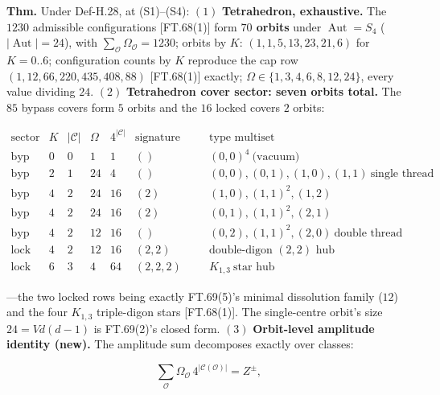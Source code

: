 \begin{theorem}\label{tag:FT-78}
\textbf{Thm.} Under Def-H.28, at (S1)–(S4): $(1)$ \textbf{Tetrahedron, exhaustive.} The $1230$ admissible configurations [FT.68(1)] form \textbf{$70$ orbits} under $\operatorname{Aut}=S_4$ ($|\operatorname{Aut}|=24$), with $\sum_{\mathcal O}\Omega_{\mathcal O}=1230$; orbits by $K$: $(1,1,5,13,23,21,6)$ for $K=0..6$; configuration counts by $K$ reproduce the cap row $(1,12,66,220,435,408,88)$ [FT.68(1)] exactly; $\Omega\in\{1,3,4,6,8,12,24\}$, every value dividing $24$. $(2)$ \textbf{Tetrahedron cover sector: seven orbits total.} The $85$ bypass covers form $5$ orbits and the $16$ locked covers $2$ orbits:

\[
\begin{array}{c|cccccc}
\text{sector} & K & |\mathcal C| & \Omega & 4^{|\mathcal C|} & \text{signature (cycles shadowed)} & \text{type multiset}\\
\hline
\text{byp} & 0 & 0 & 1 & 1 & () & (0,0)^4\ \text{(vacuum)}\\
\text{byp} & 2 & 1 & 24 & 4 & () & (0,0),(0,1),(1,0),(1,1)\ \text{single thread}\\
\text{byp} & 4 & 2 & 24 & 16 & (2) & (1,0),(1,1)^2,(1,2)\\
\text{byp} & 4 & 2 & 24 & 16 & (2) & (0,1),(1,1)^2,(2,1)\\
\text{byp} & 4 & 2 & 12 & 16 & () & (0,2),(1,1)^2,(2,0)\ \text{double thread}\\
\hline
\text{lock} & 4 & 2 & 12 & 16 & (2,2) & \text{double-digon }(2,2)\text{ hub}\\
\text{lock} & 6 & 3 & 4 & 64 & (2,2,2) & K_{1,3}\ \text{star hub}
\end{array}
\]

—the two locked rows being exactly FT.69(5)'s minimal dissolution family ($12$) and the four $K_{1,3}$ triple-digon stars [FT.68(1)]. The single-centre orbit's size $24=Vd(d{-}1)$ is FT.69(2)'s closed form. $(3)$ \textbf{Orbit-level amplitude identity (new).} The amplitude sum decomposes exactly over classes:

\[
\sum_{\mathcal O}\Omega_{\mathcal O}\,4^{|\mathcal C(\mathcal O)|}=Z^{\pm},
\]


\end{theorem}
